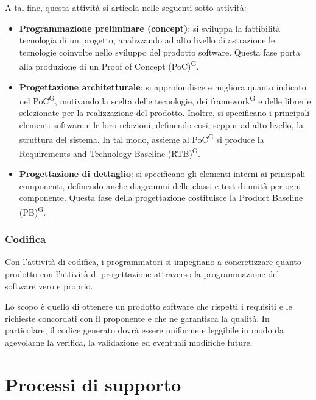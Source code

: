 A tal fine, questa attività si articola nelle seguenti sotto-attività:
\begin{itemize}
    \item \textbf{Programmazione preliminare (concept)}: si sviluppa la fattibilità tecnologia di un progetto, analizzando ad alto livello di astrazione le tecnologie coinvolte nello sviluppo del prodotto software. Questa fase porta alla produzione di un Proof of Concept (PoC)\textsuperscript{G}.
    \item \textbf{Progettazione architetturale}: si approfondisce e migliora quanto indicato nel PoC\textsuperscript{G}, motivando la scelta delle tecnologie, dei framework\textsuperscript{G} e delle librerie selezionate per la realizzazione del prodotto. Inoltre, si specificano i principali elementi software e le loro relazioni, definendo così, seppur ad alto livello, la struttura del sistema. In tal modo, assieme al PoC\textsuperscript{G} si produce la Requirements and Technology Baseline (RTB)\textsuperscript{G}.
    \item \textbf{Progettazione di dettaglio}: si specificano gli elementi interni ai principali componenti, definendo anche diagrammi delle classi e test di
    unità per ogni componente. Questa fase della progettazione costituisce la Product Baseline (PB)\textsuperscript{G}.
\end{itemize}

\subsubsection{Codifica} 
Con l'attività di codifica, i programmatori si impegnano a concretizzare quanto prodotto con l'attività di progettazione attraverso la programmazione del software vero e proprio.

Lo scopo è quello di ottenere un prodotto software che rispetti i requisiti e le richieste concordati con il proponente e che ne garantisca la qualità. In particolare, il codice generato dovrà essere uniforme e leggibile in modo da agevolarne la verifica, la validazione ed eventuali modifiche future.


\newpage
\section{Processi di supporto}\label{sec:processi_di_supporto}


